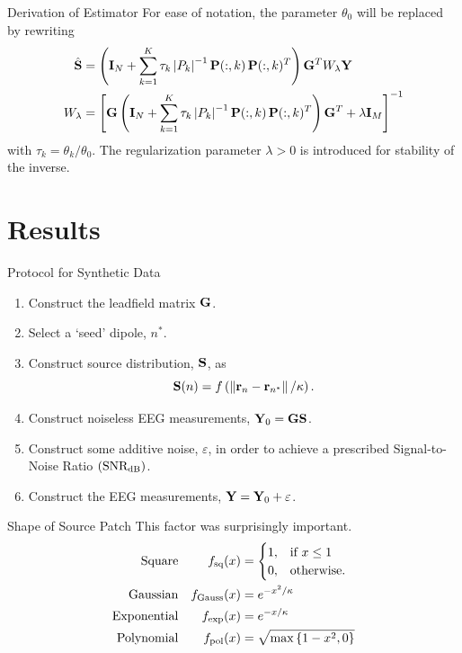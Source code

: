 \documentclass[progressbar=head]{beamer}
\begin{document}
\begin{frame}{Derivation of Estimator}
For ease of notation, the parameter $\theta_0$ will be replaced by rewriting
\begin{align}
    \hat{\mathbf{S}}
    &=
    \left(  \mathbf{I}_N + \sum_{k=1}^K \tau_k \left| {P_k} \right|^{-1} 
    \mathbf{P}(:,k)\, \mathbf{P}(:,k)^T
     \right) \mathbf{G}^T W_\lambda \mathbf{Y}
    \label{eq:3.24}
    \\
    W_\lambda &=
    \left[ \mathbf{G} \left(  \mathbf{I}_N + \sum_{k=1}^K \tau_k \left| {P_k} \right|^{-1} 
    \mathbf{P}(:,k)\, \mathbf{P}(:,k)^T
     \right) \mathbf{G}^T + \lambda \mathbf{I}_M  \right]^{-1}
    \label{eq:3.25}
\end{align}
with $\tau_k = \theta_k/\theta_0$.
%
The regularization parameter $\lambda>0$ is introduced for stability of the inverse.
\end{frame}

\section{Results}

\begin{frame}{Protocol for Synthetic Data}
\begin{enumerate}
    \item Construct the leadfield matrix $\mathbf{G}$.
    \item Select a `seed' dipole, $n^*$.
    \item Construct source distribution, $\mathbf{S}$, as
    \begin{equation}
\mathbf{S}(n) = f\left(  \left\lVert \mathbf{r}_n-\mathbf{r}_{n^*} \right\rVert / \kappa  \right).
\end{equation}
    \item Construct noiseless EEG measurements, $\mathbf{Y}_0 = \mathbf{G} \mathbf{S}$.
    \item Construct some additive noise, $\varepsilon$, in order to achieve a prescribed Signal-to-Noise Ratio $\left( \text{SNR}_\text{dB} \right)$.
    \item Construct the EEG measurements, $\mathbf{Y} = \mathbf{Y}_0 + \varepsilon$.
\end{enumerate}
\end{frame}

\begin{frame}{Shape of Source Patch}
This factor was surprisingly important.
\begin{align}
\text{Square} &&
    f_\text{sq}(x) 
    &= 
    \begin{cases}
1, &\text{if } x\leq 1 \\
0, &\text{otherwise}.
\end{cases}
    \\
\text{Gaussian} &&
    f_\text{Gauss}(x) 
    &= 
    e^{-x^2/\kappa}
    \\
\text{Exponential} &&
    f_\text{exp}(x) 
    &= 
    e^{-x/\kappa}
    \\
\text{Polynomial} &&
    f_\text{pol}(x) 
    &= 
    \sqrt{ \max \left\{ 1-{x}^2, 0  \right\}}
\end{align}
\end{frame}
\end{document}
